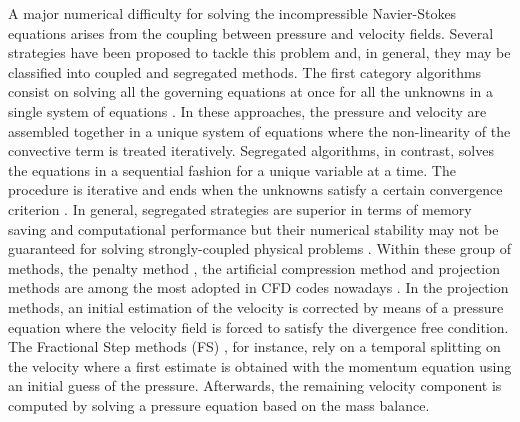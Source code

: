 \documentclass[final,3p,times,11pt,onecolumn]{myElsarticle}
\numberwithin{equation}{section}
\begin{document}
A major numerical difficulty for solving the incompressible Navier-Stokes equations arises from the coupling between
pressure and velocity fields. Several strategies have been proposed to tackle this problem and, in general, they may
be classified into coupled and segregated methods. The first category algorithms consist on solving all the governing
equations at once for all the unknowns in a single system of equations \cite{mazhar1, mazhar2, chen, darwish1, darwish2, uroic}. In these approaches, the pressure and velocity are assembled together in a unique system of equations where the non-linearity of the convective term is treated iteratively. Segregated algorithms, in contrast, solves the equations in a sequential fashion for a unique variable at a time. The procedure is iterative and ends when the unknowns satisfy a certain convergence criterion \cite{ferziger, versteeg, moukalled}. In general, segregated strategies are superior in terms of memory saving and computational performance but their numerical stability may not be guaranteed for solving strongly-coupled physical problems \cite{wang2, uroic}. Within these group of methods, the penalty method \cite{temam1968methode}, the artificial compression method \cite{harten1977artificial} and projection methods \cite{chorin1, chorin2, temam1968methode} are among the most adopted in CFD codes nowadays \cite{wang2}. In the projection methods, an initial estimation of the velocity is corrected by means of a pressure equation where the velocity field is forced to satisfy the divergence free condition. The Fractional Step methods (FS) \cite{kim}, for instance, rely on a temporal splitting on the velocity where a first estimate is obtained with the momentum equation using an initial guess of the pressure. Afterwards, the remaining velocity component is computed by solving a pressure equation based on the mass balance.
\end{document}
